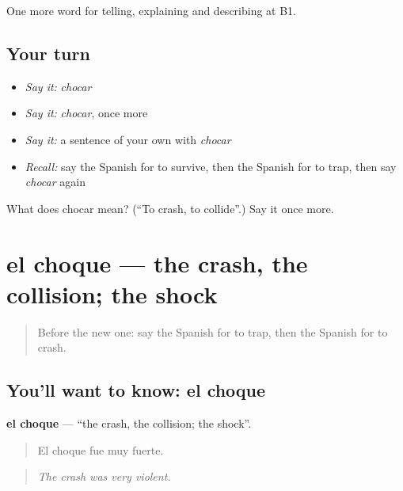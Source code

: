 \begin{grammarlens}[title={What you've built}]
One more word for telling, explaining and describing at B1.
\end{grammarlens}

\subsection*{Your turn}
\begin{itemize}
\raggedright
  \item \emph{Say it:} \emph{chocar}
  \item \emph{Say it:} \emph{chocar}, once more
  \item \emph{Say it:} a sentence of your own with \emph{chocar}
  \item \emph{Recall:} say the Spanish for to survive, then the Spanish for to trap, then say \emph{chocar} again
\end{itemize}

\begin{tcolorbox}[breakable,colback=teal!4,colframe=teal!35!black,title={Before you move on}]
What does chocar mean? (\textquotedblleft{}To crash, to collide\textquotedblright{}.) Say it once more.
\end{tcolorbox}
\section[el choque]{el choque — the crash, the collision; the shock}

\label{lesson:ES-C527-choque}



\begin{quote}
Before the new one: say the Spanish for to trap, then the Spanish for to crash.
\end{quote}

\subsection*{You'll want to know: el choque}
\textbf{el choque} — \textquotedblleft{}the crash, the collision; the shock\textquotedblright{}.

\begin{quote}
El choque fue muy fuerte.
\end{quote}

\begin{quote}
\emph{The crash was very violent.}
\end{quote}

